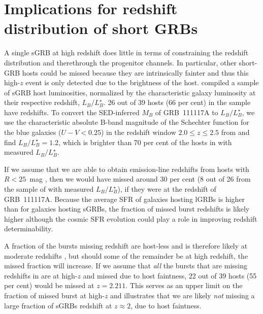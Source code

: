 \documentclass{aa}    %
\begin{document}
\section{Implications for redshift distribution of short GRBs}

A single sGRB at high redshift does little in terms of constraining the redshift
distribution and therethrough the progenitor channels. In particular, other
short-GRB hosts could be missed because they are intrinsically fainter and thus
this high-$z$ event is only detected due to the brightness of the host.
\citet{Berger2014} compiled a sample of sGRB host luminosities, normalized by
the characteristic galaxy luminosity at their respective redshift,
$L_B/L^{\star}_{B}$. 26 out of 39 hosts (66 per cent) in the sample have
redshifts. To convert the SED-inferred $M_B$ of GRB~111117A to
$L_B/L^{\star}_{B}$, we use the characteristic absolute B-band magnitude of the
Schechter function for the blue galaxies ($U - V < 0.25$) in the redshift window
$2.0 \leq z \leq 2.5$ from \citet{Marchesini2007} and find $L_B/L^{\star}_{B} =
1.2$, which is brighter than 70 per cent of the hosts in \citet{Berger2014} with
measured $L_B/L^{\star}_{B}$. 

If we assume that we are able to obtain emission-line redshifts from hosts with
$R < 25$~mag \citep{Kruhler2012}, then we would have missed around 30 per cent
(8 out of 26 from the sample of \citealt{Berger2014} with measured
$L_B/L^{\star}_{B}$), if they were at the redshift of GRB~111117A. Because the
average SFR of galaxies hosting lGRBs is higher than for galaxies hosting sGRBs,
the fraction of missed burst redshifts is likely higher although the cosmic SFR
evolution could play a role in improving redshift determinability.


A fraction of the bursts missing redshift are host-less and is therefore likely
at moderate redshifts \citep{Tunnicliffe2014}, but should some of the remainder
be at high redshift, the missed fraction will increase. If we assume that
\textit{all} the bursts that are missing redshifts in \citet{Berger2014} are at
high-$z$ and missed due to host faintness, 22 out of 39 hosts (55 per cent)
would be missed at $z = 2.211$. This serves as an upper limit on the fraction of
missed burst at high-$z$ and illustrates that we are likely \textit{not} missing a
large fraction of sGRBs redshift at $z \approx 2$, due to host faintness.
\end{document}
